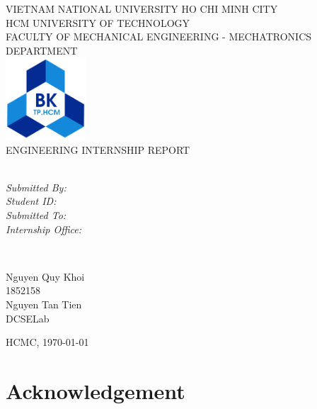 \documentclass{presets}
\begin{document}
	\begin{titlepage}
		\centering
		\small VIETNAM NATIONAL UNIVERSITY HO CHI MINH CITY\\
		HCM UNIVERSITY OF TECHNOLOGY\\
		FACULTY OF MECHANICAL ENGINEERING - MECHATRONICS DEPARTMENT\\[2cm]
		
		\includegraphics[width=3cm]{logo.png}\\[2 cm]	%
		\normalsize ENGINEERING INTERNSHIP REPORT\\[1 cm]
		{\huge \bfseries \thetitle}\\[2cm]
		
		\begin{minipage}[t]{0.4\textwidth}
			\begin{flushleft} \large
				\emph{Submitted By:}\\
				\emph{Student ID:}\\
				\emph{Submitted To:}\\
				\emph{Internship Office:}\\
			\end{flushleft}
		\end{minipage}~
		\begin{minipage}[t]{0.4\textwidth}
			
			\begin{flushright} \large
				Nguyen Quy Khoi\\
				1852158\\
				Nguyen Tan Tien\\
				DCSELab\\
			\end{flushright}
			
		\end{minipage}
		\mbox{}\vfill
		{\large HCMC, \today}
	\end{titlepage}
	\tableofcontents
	\listoffigures
	\chapter*{Acknowledgement}
	
\end{document}
